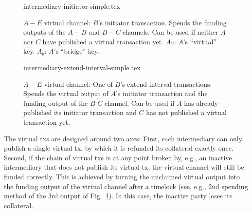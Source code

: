  \begin{figure}
    {intermediary-initiator-simple.tex}
    \caption{$A-E$ virtual channel: $B$'s initiator transaction. Spends the
    funding outputs of the $A-B$ and $B-C$ channels. Can be used if neither
    $A$ nor $C$ have published a virtual transaction yet. $A_V$: $A$'s
    ``virtual'' key. $A_b$: $A$'s ``bridge'' key.}
    \label{figure:virtual-layer-initiator-simple}
  \end{figure}

  \begin{figure}
    {intermediary-extend-interval-simple.tex}
    \caption{$A-E$ virtual channel: One of $B$'s extend interval
    transactions. Spends the virtual output of $A$'s
    initiator transaction and the funding output of the $B$-$C$ channel. Can be
    used if $A$ has already published its initiator transaction and $C$ has not
    published a virtual transaction yet.}
    \label{figure:virtual-layer-extend-interval-simple}
  \end{figure}

  The virtual txs are designed around two axes: First, each intermediary can
  only publish a single virtual tx, by which it is refunded its collateral
  exactly once. Second, if the chain of virtual txs is at any point broken by,
  e.g., an inactive intermediary that does not publish its virtual tx, the
  virtual channel will still be funded correctly. This is achieved by turning
  the unclaimed virtual output into the funding output of the virtual channel
  after a timelock (see, e.g., $2$nd spending method of the $3$rd output of
  Fig.~\ref{figure:virtual-layer-initiator-simple}). In this case, the inactive party loses its collateral.


